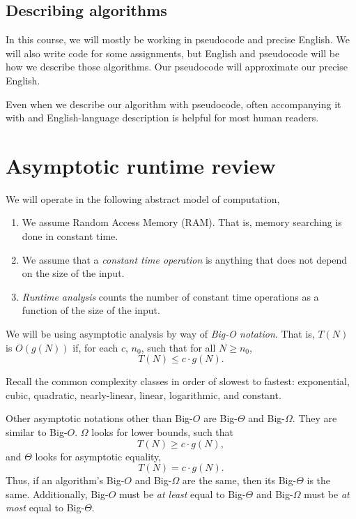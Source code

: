 \documentclass[titlepage, 12pt, leqno]{article}
\begin{document}
\subsection{Describing algorithms}
In this course, we will mostly be working in pseudocode and precise English. We
will also write code for some assignments, but English and pseudocode will be
how we describe those algorithms. Our pseudocode will approximate our precise
English.

Even when we describe our algorithm with pseudocode, often accompanying it with
and English-language description is helpful for most human readers.

\pagebreak
\section{Asymptotic runtime review}
We will operate in the following abstract model of computation,
\begin{enumerate}
    \item We assume Random Access Memory (RAM). That is, memory searching is done
        in constant time.
    \item We assume that a \textit{constant time operation} is anything that
        does not depend on the size of the input.
    \item \textit{Runtime analysis} counts the number of constant time
        operations as a function of the size of the input.
\end{enumerate}

We will be using asymptotic analysis by way of \textit{Big-O notation}. That is,
 $T(N)$ is $O(g(N))$ if, for each $c$, $n_{0}$, such that for all $N \ge n_{0}$,
 \[
 T(N) \le c \cdot g(N).
 \]
\begin{note}
    Recall the common complexity classes in order of slowest to fastest:
    exponential, cubic, quadratic, nearly-linear, linear, logarithmic, and
    constant.
\end{note}
 
Other asymptotic notations other than Big-$O$ are Big-$\Theta$ and Big-$\Omega$.
They are similar to Big-$O$. $\Omega$ looks for lower bounds, such that
\[
T(N) \ge c \cdot g(N),
\]
and $\Theta$ looks for asymptotic equality,
\[
T(N) = c \cdot g(N).
\]
Thus, if an algorithm's Big-$O$ and Big-$\Omega$ are the same, then its
Big-$\Theta$ is the same. Additionally, Big-$O$ must be \textit{at least} equal
to Big-$\Theta$ and Big-$\Omega$ must be \textit{at most} equal to
Big-$\Theta$.
\end{document}
